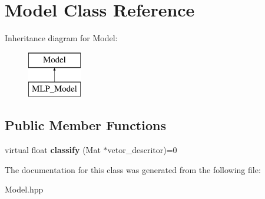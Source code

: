 \hypertarget{class_model}{\section{Model Class Reference}
\label{class_model}
}
Inheritance diagram for Model\+:\begin{figure}[H]
\begin{center}
\leavevmode
\includegraphics[height=2.000000cm]{class_model}
\end{center}
\end{figure}
\subsection*{Public Member Functions}
\begin{DoxyCompactItemize}
\item 
\hypertarget{class_model_a244b8fc6152e86e20cb581edeef7dac3}{virtual float {\bfseries classify} (Mat $\ast$vetor\+\_\+descritor)=0}\label{class_model_a244b8fc6152e86e20cb581edeef7dac3}

\end{DoxyCompactItemize}


The documentation for this class was generated from the following file\+:\begin{DoxyCompactItemize}
\item 
Model.\+hpp\end{DoxyCompactItemize}
